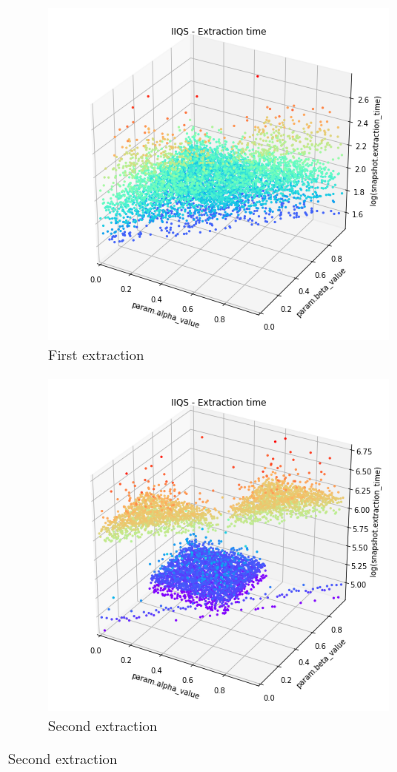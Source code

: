 \begin{figure}
    \centering
    \begin{subfigure}[b]{0.45\textwidth}
        \centering
        \includegraphics[width=0.99\textwidth]{./fragments/04_experimental_execution/images/04_alpabeta_singleclass.png.0_0.png}
        \caption{First extraction}
        \label{FIG:05_ALPHABETA_RELATIONSHIP_SINGLECLASS__0_0}
    \end{subfigure}
    \begin{subfigure}[b]{0.45\textwidth}
        \centering
        \includegraphics[width=0.99\textwidth]{./fragments/04_experimental_execution/images/04_alpabeta_singleclass.png.1_0.png}
        \caption{Second extraction}
        \label{FIG:05_ALPHABETA_RELATIONSHIP_SINGLECLASS__0_0}
    \end{subfigure}


\end{figure}
